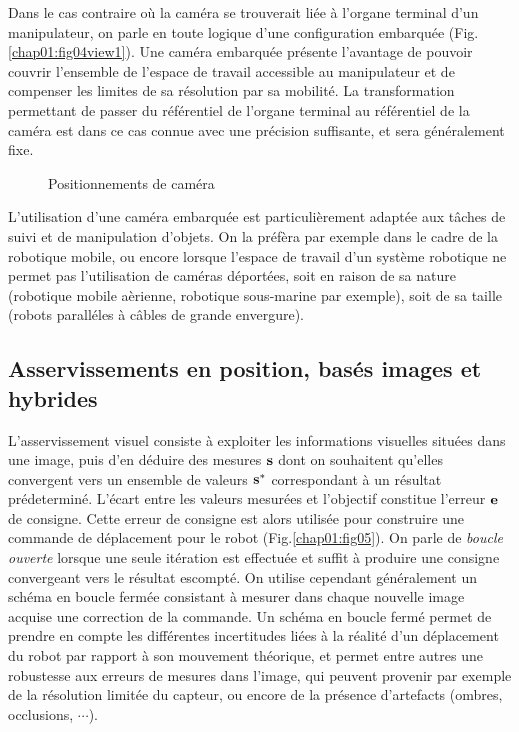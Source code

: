 Dans le cas contraire o\`u la cam\'era se trouverait li\'ee \`a l'organe 
terminal d'un manipulateur, on parle en toute logique d'une configuration 
embarquée (Fig.\ref{chap01:fig04view1}). Une cam\'era embarqu\'ee pr\'esente 
l'avantage de pouvoir couvrir l'en\-semble de l'espace de travail accessible au 
manipulateur et de compenser les limites de sa r\'esolution par sa mobilit\'e.
La transformation permettant de passer du r\'ef\'erentiel de l'organe terminal 
au r\'ef\'erentiel de la cam\'era est dans ce cas connue avec une pr\'ecision 
suffisante, et sera g\'en\'eralement fixe.

\begin{figure}[htp]
  \centering
   \hfill
    \caption{\footnotesize{Positionnements de caméra}}
\label{chap01:fig04}
\end{figure}

L'utilisation d'une cam\'era embarqu\'ee est particuli\`erement adapt\'ee aux 
t\^aches de suivi et de manipulation d'objets. On la pr\'ef\`era par exemple 
dans le cadre de la robotique mobile, ou encore lorsque l'espace de travail d'un 
syst\`eme robotique ne permet pas l'utilisation de cam\'eras d\'eport\'ees, soit 
en raison de sa nature (robotique mobile a\`erienne, robotique sous-marine par 
exemple), soit de sa taille (robots parall\'eles \`a c\^ables de grande 
envergure).


\subsection{Asservissements en position, basés images et hybrides} 
\label{chap1-1-1}

L'asservissement visuel consiste \`a exploiter les informations visuelles 
situ\'ees dans une image, puis d'en d\'eduire des mesures ${\bf s}$ dont on 
souhaitent qu'elles convergent vers un ensemble de valeurs ${\bf s}^*$ 
correspondant \`a un r\'esultat pr\'edetermin\'e. L'\'ecart entre les valeurs 
mesur\'ees et l'objectif constitue l'erreur ${\bf e}$ de consigne. Cette erreur 
de consigne est alors utilis\'ee pour construire une commande de d\'eplacement 
pour le robot (Fig.\ref{chap01:fig05}). On parle de {\it boucle ouverte} lorsque 
une seule it\'eration est effectu\'ee et suffit \`a produire une consigne 
convergeant vers le r\'esultat escompt\'e. On utilise cependant 
g\'en\'eralement un sch\'ema en boucle ferm\'ee consistant \`a mesurer dans 
chaque nouvelle image acquise une correction de la commande. Un sch\'ema en 
boucle ferm\'e permet de prendre en compte les diff\'erentes incertitudes 
li\'ees \`a la r\'ealit\'e d'un d\'eplacement du robot par rapport \`a son 
mouvement th\'eorique, et permet entre autres une robustesse aux erreurs de 
mesures dans l'image, qui peuvent provenir par exemple de la r\'esolution 
limit\'ee du capteur, ou encore de la pr\'esence d'artefacts (ombres, 
occlusions, $\cdots$).

